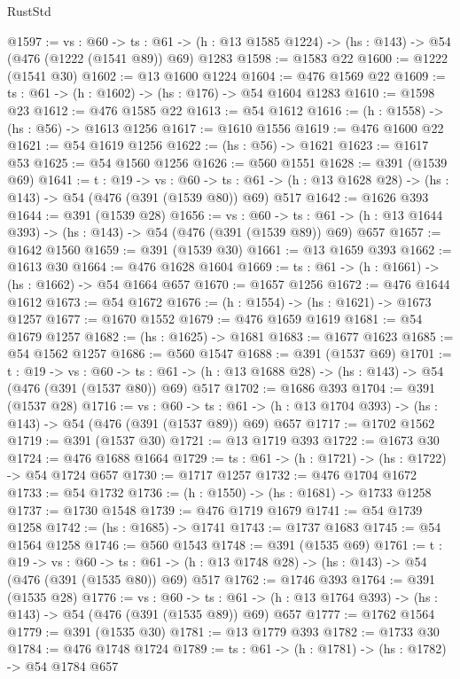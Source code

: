 \begin{lexlean}{RustStd}
\begin{coremodule}
@1597 := {vs : @60} ->
  {ts : @61} -> (h : @13 @1585 @1224) -> (hs : @143) -> @54 (@476 (@1222 (@1541 @89)) @69) @1283
@1598 := @1583 @22
@1600 := @1222 (@1541 @30)
@1602 := @13 @1600 @1224
@1604 := @476 @1569 @22
@1609 := {ts : @61} -> (h : @1602) -> (hs : @176) -> @54 @1604 @1283
@1610 := @1598 @23
@1612 := @476 @1585 @22
@1613 := @54 @1612
@1616 := (h : @1558) -> (hs : @56) -> @1613 @1256
@1617 := @1610 @1556
@1619 := @476 @1600 @22
@1621 := @54 @1619 @1256
@1622 := (hs : @56) -> @1621
@1623 := @1617 @53
@1625 := @54 @1560 @1256
@1626 := @560 @1551
@1628 := @391 (@1539 @69)
@1641 := {t : @19} ->
  {vs : @60} ->
  {ts : @61} -> (h : @13 @1628 @28) -> (hs : @143) -> @54 (@476 (@391 (@1539 @80)) @69) @517
@1642 := @1626 @393
@1644 := @391 (@1539 @28)
@1656 := {vs : @60} ->
  {ts : @61} -> (h : @13 @1644 @393) -> (hs : @143) -> @54 (@476 (@391 (@1539 @89)) @69) @657
@1657 := @1642 @1560
@1659 := @391 (@1539 @30)
@1661 := @13 @1659 @393
@1662 := @1613 @30
@1664 := @476 @1628 @1604
@1669 := {ts : @61} -> (h : @1661) -> (hs : @1662) -> @54 @1664 @657
@1670 := @1657 @1256
@1672 := @476 @1644 @1612
@1673 := @54 @1672
@1676 := (h : @1554) -> (hs : @1621) -> @1673 @1257
@1677 := @1670 @1552
@1679 := @476 @1659 @1619
@1681 := @54 @1679 @1257
@1682 := (hs : @1625) -> @1681
@1683 := @1677 @1623
@1685 := @54 @1562 @1257
@1686 := @560 @1547
@1688 := @391 (@1537 @69)
@1701 := {t : @19} ->
  {vs : @60} ->
  {ts : @61} -> (h : @13 @1688 @28) -> (hs : @143) -> @54 (@476 (@391 (@1537 @80)) @69) @517
@1702 := @1686 @393
@1704 := @391 (@1537 @28)
@1716 := {vs : @60} ->
  {ts : @61} -> (h : @13 @1704 @393) -> (hs : @143) -> @54 (@476 (@391 (@1537 @89)) @69) @657
@1717 := @1702 @1562
@1719 := @391 (@1537 @30)
@1721 := @13 @1719 @393
@1722 := @1673 @30
@1724 := @476 @1688 @1664
@1729 := {ts : @61} -> (h : @1721) -> (hs : @1722) -> @54 @1724 @657
@1730 := @1717 @1257
@1732 := @476 @1704 @1672
@1733 := @54 @1732
@1736 := (h : @1550) -> (hs : @1681) -> @1733 @1258
@1737 := @1730 @1548
@1739 := @476 @1719 @1679
@1741 := @54 @1739 @1258
@1742 := (hs : @1685) -> @1741
@1743 := @1737 @1683
@1745 := @54 @1564 @1258
@1746 := @560 @1543
@1748 := @391 (@1535 @69)
@1761 := {t : @19} ->
  {vs : @60} ->
  {ts : @61} -> (h : @13 @1748 @28) -> (hs : @143) -> @54 (@476 (@391 (@1535 @80)) @69) @517
@1762 := @1746 @393
@1764 := @391 (@1535 @28)
@1776 := {vs : @60} ->
  {ts : @61} -> (h : @13 @1764 @393) -> (hs : @143) -> @54 (@476 (@391 (@1535 @89)) @69) @657
@1777 := @1762 @1564
@1779 := @391 (@1535 @30)
@1781 := @13 @1779 @393
@1782 := @1733 @30
@1784 := @476 @1748 @1724
@1789 := {ts : @61} -> (h : @1781) -> (hs : @1782) -> @54 @1784 @657

\end{coremodule}
\end{lexlean}
